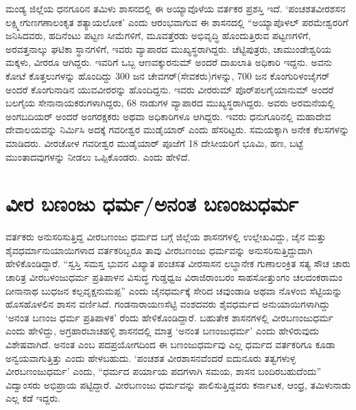 ಮಂಡ್ಯ ಜಿಲ್ಲೆಯ ಧನಗೂರಿನ ತಮಿಳು ಶಾಸನದಲ್ಲಿ ಈ ಅಯ್ಯಾವೊಳೆಯ ವರ್ತಕರ ಪ್ರಶಸ್ತಿ ಇದೆ. ‘ಪಂಚಶತವೀರಶಸನ ಲಕ್ಷ್ಮೀಗುಣಗಣಾಲಂಕೃತ ಶತ್ಯಾಯಲೋಕ’ ಎಂದು ಆರಂಭವಾಗುವ ಈ ಶಾಸನದಲ್ಲಿ “ಅಯ್ಯಾಪೊಳಲ್​ ಪರಮೇಶ್ವರರಿಗೆ ಜನಿಸಿದವರು, ಹದಿನೆಂಟು ಪಟ್ಟಣ ಸೀಮೆಗಳಿಗೆ, ಮೂವತ್ತೆರಡು ಅಭಿವೃದ್ಧಿ ಹೊಂದುತ್ತಿರುವ ಪಟ್ಟಣಗಳಿಗೆ, ಅರವತ್ತನಾಲ್ಕು ಘಟಿಕಾ ಸ್ಥಾನಗಳಿಗೆ, ಇವರು ವ್ಯಾಪಾರದ ಮುಖ್ಯಸ್ಥರಾಗಿದ್ದರು. ಚೆಟ್ಟಿಪುತ್ರರು, ಚಾಮುಂಡೇಶ್ವರಿಯ ಮಕ್ಕಳು, ವೀರರೂ ಆಗಿದ್ದರು. ಇವರಿಗೆ ಒಬ್ಬ ಆಣವಕ್ಕುರನುಮ್ ಅಂದರೆ ದಾಖಲಾತಿ ಅಧಿಕಾರಿ ಇದ್ದನು. ಅವನು ಕೋಟೆ ಕೊತ್ತಲುಗಳನ್ನು ಹೊಂದಿದ್ದು 300 ಜನ ಚೇವಗರ್​(ಸೇವಕರು)ಗಳನ್ನು, 700 ಜನ ಕೊಂಗುರಿಳಂಜೈಗರ್​ ಅಂದರೆ ಕೊಂಗುನಾಡಿನ ಯುವವೀರರನ್ನು ಹೊಂದಿದ್ದನು. ಇವರು ವೀರರುಮ್ ಪೊರ್​ಪಲಗೈಯಾನುಮ್ ಅಂದರೆ ಬಲಗೈಯ ಸೇನಾನಾಯಕರುಗಳಾಗಿದ್ದರು, 68 ನಾಡುಗಳ ವ್ಯಾಪಾರದ ಮುಖ್ಯಸ್ಥರಾಗಿದ್ದರು. ಅವರು ಅರಮನೆಯಲ್ಲಿ ಅಂಗಬದಿಯರ್​ ಅಂದರೆ ಅಂಗರಕ್ಷಕರು ಅಥವಾ ಅಧಿಕಾರಿಗಳೂ ಆಗಿದ್ದರು. ಇವರು ಧನುಗೂರಿನಲ್ಲಿ ಮಹಾದೇವ ದೇವಾಲಯವನ್ನು ನಿರ್ಮಿಸಿ ಅದಕ್ಕೆ ಗವರೀಶ್ವರ ಮುಡೈಯಾರ್​ ಎಂದು ಹೆಸರಿಟ್ಟರು. ಸಮಯಕ್ಕಾಗಿ ಅನೇಕ ಕೆಲಸಗಳನ್ನು ಮಾಡಿದರು. ವೀರಚೋಳ ಗವರೀಶ್ವರ ಮುಡೈಯಾರ್​ ಪೂಜೆಗೆ 18 ದೇಸೀಯರಿಗೆ ಭೂಮಿ, ಹಣ, ಬಟ್ಟೆ ಮುಂತಾದವುಗಳನ್ನು ನೀಡಲು ಒಪ್ಪಿಕೊಂಡರು. ಎಂದು ಹೇಳಿದೆ.


\section{ವೀರ ಬಣಂಜು ಧರ್ಮ/ಅನಂತ ಬಣಂಜುಧರ್ಮ}

ವರ್ತಕರು ಅನುಸರಿಸುತ್ತಿದ್ದ ವೀರಬಣಂಜು ಧರ್ಮದ ಬಗ್ಗೆ ಜಿಲ್ಲೆಯ ಶಾಸನಗಳಲ್ಲಿ ಉಲ್ಲೇಖವಿದ್ದು, ಜೈನ ಮತ್ತು ಶೈವಧರ್ಮಾನುಯಾಯಿಗಳಾದ ವರ್ತಕರಿಬ್ಬರೂ ತಾವು ವೀರಬಣಂಜು ಧರ್ಮವನ್ನು ಅನುಸರಿಸುತ್ತಿದ್ದುದಾಗಿ ಹೇಳಿಕೊಂಡಿದ್ದಾರೆ. “ಸ್ವಸ್ತಿ ಸಮಸ್ತ ಭುವನ ವಿಖ್ಯಾತ ಪಂಚಸತ ವೀರಸಾಸನ ಲಬ್ಧಾನೇಕ ಗುಣಾಲಂಕ್ರಿತ ಸತ್ಯ ಸೌಚ ಚಾರು ಚಾರಿತ್ರ ವೀರಬಳಂಜುಧರ್ಮ ಪ್ರತಿಪಾಳನ ವಿಸುದ್ಧ ಗುಡ್ಡಧ್ವಜ ವಿರಾಜಿರಾಂಬರಂ ಸಾಹಸೋತ್ತುಂಗಂ ಚಲದಂಕರಾಮಂ ದೀನಾನಾಥ ಬುಧಜನ ಕಲ್ಪವೃಕ್ಷನುಮಪ್ಪ” ಎಂದು ಜೈನಧರ್ಮಕ್ಕೆ ಸೇರಿದ ಚವುಂಡಾಡಿ ಅಥವಾ ನೊಳಂಬಿ ಸೆಟ್ಟಿಯನ್ನು ಹೊಸಹೊಳಲಿನ ಶಾಸನ ವರ್ಣಿಸಿದೆ. ಗಂಡನಾರಾಯಣಸೆಟ್ಟಿ ವಂಶದವರು ಶೈವಧರ್ಮದ ಅನುಯಾಯಿಗಳಾಗಿದ್ದು ‘ಅನಂತ ಬಣಂಜ ಧರ್ಮ ಪ್ರತಿಪಾಳಕ’ ರೆಂದು ಹೇಳಿಕೊಂಡಿದ್ದಾರೆ. ಬಹುತೇಕ ಶಾಸನಗಳಲ್ಲಿ ವೀರಬಣಂಜುಧರ್ಮ ಎಂದು ಹೇಳಿದ್ದು, ಅಗ್ರಹಾರಬಾಚಹಳ್ಳಿ ಶಾಸನದಲ್ಲಿ ಮಾತ್ರ ‘ಅನಂತ ಬಣಂಜುಧರ್ಮ’ ಎಂದು ಹೇಳಿರುವುದು ವಿಶೇಷವಾಗಿದೆ. ಅನಂತ ಎಂಬ ಪದಪ್ರಯೋಗದಿಂದ ಈ ಬಣಂಜುಧರ್ಮವು ಎಲ್ಲ ಧರ್ಮದ ವರ್ತಕರಿಗೂ ಕೂಡಾ ಅನ್ವಯವಾಗುತ್ತಿತ್ತು ಎಂದು ಹೇಳಬಹುದು. ‘ಪಂಚಶತ ವೀರಶಾಸನವೆಂದರೆ ಐದುನೂರು ತತ್ವಗಳುಳ್ಳ ವೀರಬಣಂಜುಧರ್ಮ’ ಎಂದು, “ಧರ್ಮದ ಪರ್ಯಾಯ ಪದಗಳಾಗಿ ಸಮಯ, ಶಾಸನ ಬಂದಿರಬಹುದೆಂದು” ವಿದ್ವಾಂಸರು ಅಭಿಪ್ರಾಯ ಪಟ್ಟಿದ್ದಾರೆ. ವೀರಬಣಂಜು ಧರ್ಮವನ್ನು ಪಾಲಿಸುತ್ತಿದ್ದವರು ಕರ್ನಾಟಕ, ಆಂಧ್ರ, ತಮಿಳುನಾಡು ಎಲ್ಲ ಕಡೆ ಇದ್ದರು.


